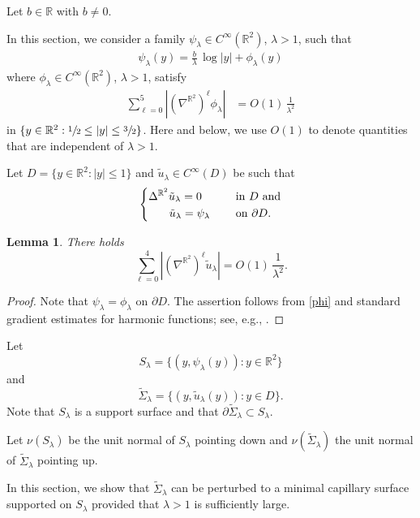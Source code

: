 \documentclass[11pt]{amsart}
\newtheorem{lem}[prop]{Lemma}
\begin{document}
Let $b\in \mathbb{R}$ with $b\neq 0$. 

In this section, we consider a family 
   $\psi_\lambda \in C^\infty(\mathbb{R}^2)$, $\lambda>1$,  such that 
\begin{align} \label{psi}
\psi_\lambda(y)=\frac{b}{\lambda}\,\log|y|+\phi_\lambda(y)
\end{align}
where $\phi_\lambda \in C^\infty(\mathbb{R}^2)$, $\lambda>1$, satisfy
\begin{equation} \label{phi}
\begin{aligned} 
\sum_{\ell=0}^5|(\nabla^{\mathbb{R}^2})^\ell\phi_\lambda|&=O(1)\,\frac{1}{\lambda^2}
\end{aligned} 
\end{equation}
in  $\{y\in \mathbb{R}^2:\sfrac12\leq |y|\leq \sfrac32\}$. Here and below, we use $O(1)$ to denote quantities that are independent of $\lambda>1$.


Let $D=\{y\in \mathbb{R}^2:|y|\leq 1\}$ and
$\tilde u_\lambda\in C^\infty(D)$ be such that 
\begin{equation} \label{harmonic pde}
\begin{dcases}
	\Delta^{\mathbb{R}^2}\tilde u_\lambda=0\qquad&\text{in $D$ and}\\
	\quad\,\,\,\,\,\tilde u_\lambda=\psi_\lambda &\text{on $\partial D$}.
\end{dcases}
\end{equation}


\begin{lem} \label{psi estimates}
	There holds
	$$
	\sum_{\ell=0}^4|(\nabla^{\mathbb{R}^2})^\ell\tilde u_\lambda|=O(1)\,\frac{1}{\lambda^2}.	$$
\end{lem}
\begin{proof}
	Note that $\psi_\lambda=\phi_\lambda$ on $\partial D$. The assertion follows from  \eqref{phi} and standard gradient estimates for harmonic functions; see, e.g., \cite[Theorem 2.10]{GilbargTrudinger}.
\end{proof}
Let $$S_\lambda=\{(y,\psi_\lambda(y)):y\in \mathbb{R}^2\}$$
and
$$
\tilde \Sigma_{\lambda}=\{(y,\tilde u_{\lambda}(y)):y\in D\}.
$$
Note that $S_\lambda$ is a support surface and that $\partial \tilde \Sigma_{\lambda}\subset S_\lambda$.

Let $\nu(S_\lambda)$ be the unit normal of $S_\lambda$ pointing down and $\nu(\tilde \Sigma_{\lambda})$  the unit normal of  $\tilde \Sigma_{\lambda}$ pointing up.


In this section, we show that $\tilde \Sigma_\lambda$ can be perturbed to a minimal capillary surface supported on $S_\lambda$ provided that $\lambda>1$ is sufficiently large. 
\end{document}
